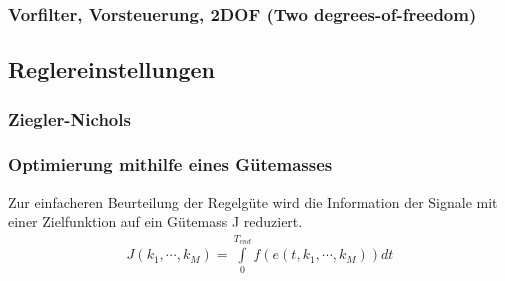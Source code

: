 \subsubsection{Vorfilter, Vorsteuerung, 2DOF (Two degrees-of-freedom) }


\subsection{Reglereinstellungen }

\subsubsection{Ziegler-Nichols  }

\subsubsection{Optimierung mithilfe eines Gütemasses }

Zur einfacheren Beurteilung der Regelgüte wird die Information der Signale mit einer Zielfunktion auf ein
Gütemass J reduziert.
\begin{eqnarray}
J(k_1,\cdots,k_M)=\int\limits_{0}^{T_{end}}f(e(t,k_1,\cdots,k_M))dt\\
\end{eqnarray}


